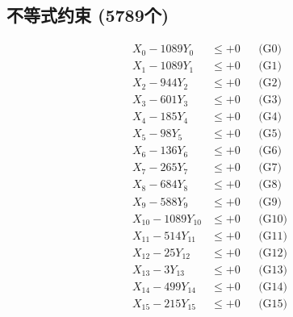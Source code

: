 \documentclass[a4paper,10pt]{article}
\begin{document}
\subsection{不等式约束 (5789个)}

\allowdisplaybreaks
{\small
\begin{align}
\allowbreak
\allowbreak
\allowbreak
\allowbreak
\allowbreak
\allowbreak
\allowbreak
\allowbreak
\allowbreak
\allowbreak
\allowbreak
\allowbreak
\allowbreak
\allowbreak
\allowbreak
\allowbreak
\allowbreak
\allowbreak
\allowbreak
\allowbreak
\allowbreak
\allowbreak
\allowbreak
\allowbreak
\allowbreak
\allowbreak
\allowbreak
\allowbreak
\allowbreak
\allowbreak
\allowbreak
\allowbreak
\allowbreak
\allowbreak
\allowbreak
\allowbreak
\allowbreak
\allowbreak
\allowbreak
\allowbreak
\allowbreak
\allowbreak
\allowbreak
\allowbreak
\allowbreak
\allowbreak
\allowbreak
\allowbreak
\allowbreak
\allowbreak
\allowbreak
\allowbreak
\allowbreak
\allowbreak
\allowbreak
\allowbreak
\allowbreak
\allowbreak
\allowbreak
\allowbreak
\allowbreak
\allowbreak
\allowbreak
\allowbreak
\allowbreak
\allowbreak
\allowbreak
\allowbreak
\allowbreak
\allowbreak
\allowbreak
\allowbreak
\allowbreak
\allowbreak
\allowbreak
\allowbreak
\allowbreak
\allowbreak
X_{0} - 1089Y_{0} &\leq +0 && \text{(G0)} \\
\allowbreak
X_{1} - 1089Y_{1} &\leq +0 && \text{(G1)} \\
X_{2} - 944Y_{2} &\leq +0 && \text{(G2)} \\
X_{3} - 601Y_{3} &\leq +0 && \text{(G3)} \\
X_{4} - 185Y_{4} &\leq +0 && \text{(G4)} \\
X_{5} - 98Y_{5} &\leq +0 && \text{(G5)} \\
X_{6} - 136Y_{6} &\leq +0 && \text{(G6)} \\
X_{7} - 265Y_{7} &\leq +0 && \text{(G7)} \\
X_{8} - 684Y_{8} &\leq +0 && \text{(G8)} \\
X_{9} - 588Y_{9} &\leq +0 && \text{(G9)} \\
X_{10} - 1089Y_{10} &\leq +0 && \text{(G10)} \\
\allowbreak
X_{11} - 514Y_{11} &\leq +0 && \text{(G11)} \\
X_{12} - 25Y_{12} &\leq +0 && \text{(G12)} \\
X_{13} - 3Y_{13} &\leq +0 && \text{(G13)} \\
X_{14} - 499Y_{14} &\leq +0 && \text{(G14)} \\
X_{15} - 215Y_{15} &\leq +0 && \text{(G15)} \\

\end{align}}
\end{document}
